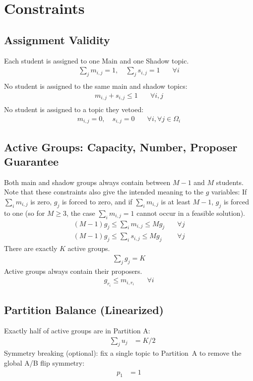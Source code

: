 \documentclass[12pt]{article}
\begin{document}
	\section{Constraints}
	
	\subsection{Assignment Validity}
	Each student is assigned to one Main and one Shadow topic.
	\begin{align}
		\sum_{j} m_{i,j} = 1, \quad \sum_{j} s_{i,j} = 1 \quad & \forall i \\
	\end{align}
	No student is assigned to the same main and shadow topics:
	\begin{align}
		m_{i,j} + s_{i,j} \le 1 \quad & \forall i, j \\
	\end{align}
	No student is assigned to a topic they vetoed:
	\begin{align}
		m_{i,j} = 0, \quad s_{i,j} = 0 \quad & \forall i, \forall j \in \Omega_i
	\end{align}
	
	\subsection{Active Groups: Capacity, Number, Proposer Guarantee}
	Both main and shadow groups always contain between $M-1$ and $M$ students. Note that these constraints also give the intended meaning to the $g$ variables: If $\sum_i m_{i,j}$ is zero, $g_j$ is forced to zero, and if $\sum_i m_{i,j}$ is at least $M-1$, $g_j$ is forced to one (so for $M\ge 3$, the case $\sum_i m_{i,j}=1$ cannot occur in a feasible solution).
	\begin{align}
		(M-1)g_j \le \sum_{i} m_{i,j} \le M g_j \quad & \forall j \\
		(M-1)g_j \le \sum_{i} s_{i,j} \le M g_j \quad & \forall j 
	\end{align}
	There are exactly $K$ active groups.
	\begin{align}
		\sum_j g_j = K
	\end{align}
	Active groups always contain their proposers.
	\begin{align}
		g_{r_i} \le m_{i, r_i} \quad & \forall i
	\end{align}
	
	\subsection{Partition Balance (Linearized)}
	Exactly half of active groups are in Partition A:
	\begin{align}
		\quad \sum_j u_j &= K/2
	\end{align}
	Symmetry breaking (optional): fix a single topic to Partition~A to remove the global A/B flip symmetry:
	\begin{align}
		p_1 &= 1
	\end{align}
\end{document}
